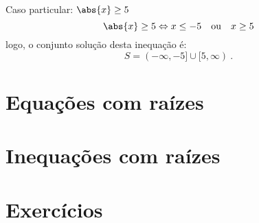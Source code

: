 \begin{exem}
   Caso particular: $\abs{x} \geq 5$
\begin{equation}
\abs{x} \geq 5 \Leftrightarrow x \leq -5 \ \ \text{ ou } \ \ x \geq 5
\end{equation}
   logo, o conjunto solução desta inequação é:
\begin{equation}
S= (-\infty, -5] \cup [5, \infty) \ . 
\end{equation}
 \end{exem}


 \section{Equações com raízes}

 \section{Inequações com raízes}
 
 \section{Exercícios}

\construirExer
